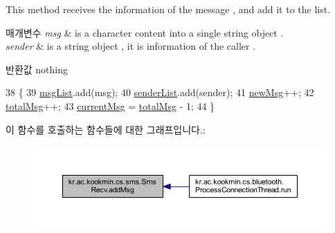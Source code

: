 This method receives the information of the message , and add it to the list. 


\begin{DoxyParams}{매개변수}
{\em msg} & is a character content into a single string object . \\
\hline
{\em sender} & is a string object , it is information of the caller . \\
\hline
\end{DoxyParams}
\begin{DoxyReturn}{반환값}
nothing 
\end{DoxyReturn}

\begin{DoxyCode}
38   \{
39     \hyperlink{classkr_1_1ac_1_1kookmin_1_1cs_1_1sms_1_1_sms_recv_ab66f609a7e9d8b44f412ce86f4201372}{msgList}.add(msg);
40     \hyperlink{classkr_1_1ac_1_1kookmin_1_1cs_1_1sms_1_1_sms_recv_a486abb44de1e3587a26c1c05d4eb96a8}{senderList}.add(sender);
41     \hyperlink{classkr_1_1ac_1_1kookmin_1_1cs_1_1sms_1_1_sms_recv_aaf779b19a6535e13097318be45a1da55}{newMsg}++;
42     \hyperlink{classkr_1_1ac_1_1kookmin_1_1cs_1_1sms_1_1_sms_recv_a6463fdd6154cad89cd16cac0e0ffc1c1}{totalMsg}++;
43     \hyperlink{classkr_1_1ac_1_1kookmin_1_1cs_1_1sms_1_1_sms_recv_a1c638ce05403d24764158c952cd08996}{currentMsg} = \hyperlink{classkr_1_1ac_1_1kookmin_1_1cs_1_1sms_1_1_sms_recv_a6463fdd6154cad89cd16cac0e0ffc1c1}{totalMsg} - 1;
44   \}
\end{DoxyCode}


이 함수를 호출하는 함수들에 대한 그래프입니다.\+:\nopagebreak
\begin{figure}[H]
\begin{center}
\leavevmode
\includegraphics[width=350pt]{classkr_1_1ac_1_1kookmin_1_1cs_1_1sms_1_1_sms_recv_a1af0ff6d2aaddfc050a6726c4311e88e_icgraph}
\end{center}
\end{figure}


\hypertarget{classkr_1_1ac_1_1kookmin_1_1cs_1_1sms_1_1_sms_recv_a5607c963dfb2568069905b189fcc1e1e}{}
